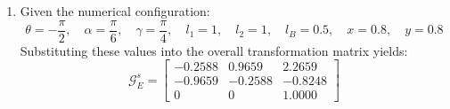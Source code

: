 \begin{enumerate}[label=\textbf{(\alph*)}]
    Multiplying and simplifying yields:
    \begin{equation}
        \mathcal{G}_E^s = \begin{bmatrix}
            \sin(\theta + \alpha + \gamma) & \cos(\theta + \alpha + \gamma) & x + l_B \cos\theta + l_1 \cos(\theta + \alpha) + l_2 \cos(\theta + \alpha + \gamma) \\[0.5em]
            -\cos(\theta + \alpha + \gamma) & \sin(\theta + \alpha + \gamma) & y + l_B \sin\theta + l_1 \sin(\theta + \alpha) + l_2 \sin(\theta + \alpha + \gamma) \\[0.5em]
            0 & 0 & 1
        \end{bmatrix}
    \end{equation}

    \item Given the numerical configuration:
    \begin{equation*}
        \theta = -\frac{\pi}{2}, \quad \alpha = \frac{\pi}{6}, \quad \gamma = \frac{\pi}{4}, \quad l_1 = 1, \quad l_2 = 1, \quad l_B = 0.5, \quad x = 0.8, \quad y = 0.8
    \end{equation*}
    Substituting these values into the overall transformation matrix yields:
    \begin{equation}
        \mathcal{G}_E^s = \begin{bmatrix}
            -0.2588 & 0.9659 & 2.2659 \\
            -0.9659 & -0.2588 & -0.8248 \\
            0 & 0 & 1.0000
        \end{bmatrix}
    \end{equation}


\end{enumerate}
